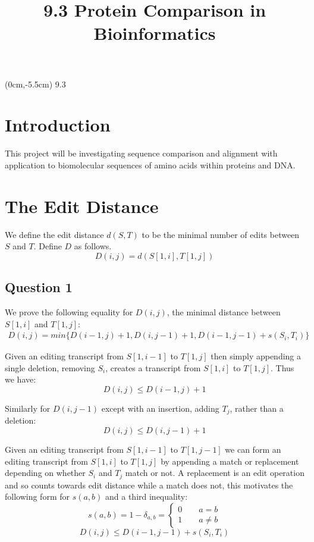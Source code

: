 \documentclass[a4paper]{article}
\title{\vspace*{2cm}9.3 Protein Comparison in Bioinformatics\vspace*{-1.5cm}}
\date{}
\begin{document}
\maketitle

\begin{textblock*}{100mm}(0cm,-5.5cm)
\Huge 9.3
\end{textblock*}

\section*{Introduction}

This project will be investigating sequence comparison and alignment with application to biomolecular sequences of amino acids within proteins and DNA.

\section*{The Edit Distance}

We define the edit distance $d(S,T)$ to be the minimal number of edits between $S$ and $T$. Define $D$ as follows.
\[ D(i,j) = d(S[1,i],T[1,j]) \]

\subsection*{Question 1}

We prove the following equality for $D(i,j)$, the minimal distance between $S[1,i]$ and $T[1,j]$:
\begin{align}
    \label{eq:q1}
    D(i,j) = min\{ D(i-1,j)+1, D(i,j-1)+1, D(i-1,j-1)+s(S_i,T_i)\}
\end{align}

Given an editing transcript from $S[1,i-1]$ to $T[1,j]$ then simply appending a single deletion, removing $S_i$, creates a transcript from $S[1,i]$ to $T[1,j]$. Thus we have:
\[ D(i,j) \leq D(i-1,j)+1 \]

Similarly for $D(i,j-1)$ except with an insertion, adding $T_j$, rather than a deletion:
\[ D(i,j) \leq D(i,j-1)+1 \]

Given an editing transcript from $S[1,i-1]$ to $T[1,j-1]$ we can form an editing transcript from $S[1,i]$ to $T[1,j]$ by appending a match or replacement depending on whether $S_i$ and $T_j$ match or not. A replacement is an edit operation and so counts towards edit distance while a match does not, this motivates the following form for $s(a,b)$ and a third inequality:
\[ s(a,b) = 1 - \delta_{a,b} = \begin{cases} 0 \qquad a=b \\ 1 \qquad a\neq b \end{cases}\]
\[ D(i,j) \leq D(i-1,j-1)+s(S_i,T_i) \]
\end{document}
